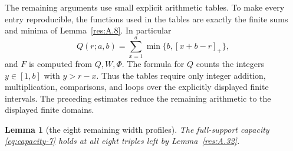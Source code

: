 \documentclass[11pt]{article}
\newtheorem{lemma}[theorem]{Lemma}
\theoremstyle{definition}
\theoremstyle{remark}
\theoremstyle{plain}
\begin{document}
The remaining arguments use small explicit arithmetic tables. To make every entry reproducible, the functions used in the tables are exactly the finite sums and minima of Lemma~\ref{res:A.8}. In particular
\[
Q(r;a,b)=\sum_{x=1}^{a}\min\{b,[x+b-r]_+\},
\]
and \(F\) is computed from \(Q,W,\Phi\). The formula for \(Q\) counts the integers \(y\in[1,b]\) with \(y>r-x\). Thus the tables require only integer addition, multiplication, comparisons, and loops over the explicitly displayed finite intervals. The preceding estimates reduce the remaining arithmetic to the displayed finite domains.

\begin{lemma}[the eight remaining width profiles]\label{res:A.33}
The full-support capacity \eqref{eq:capacity-7} holds at all eight triples left by
Lemma~\ref{res:A.32}.
\end{lemma}
\end{document}
